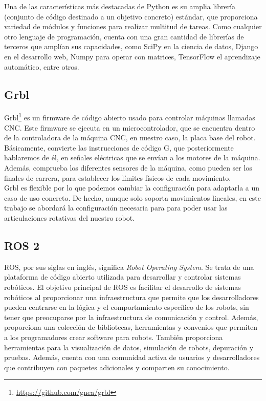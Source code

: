 Una de las características más destacadas de Python es su amplia librería (conjunto de código destinado a un objetivo concreto) estándar, que proporciona 
variedad de módulos y funciones para realizar multitud de tareas. Como cualquier otro lenguaje de programación, cuenta con una gran cantidad de librerías de terceros que 
amplían sus capacidades, como SciPy en la ciencia de datos, Django en el desarrollo web, Numpy para operar con matrices, TensorFlow el aprendizaje automático, entre otros.

\subsection{Grbl}
\label{subsec:grbl}
Grbl\footnote{\url{https://github.com/gnea/grbl}} es un firmware de código abierto usado para controlar máquinas llamadas \acs{CNC}. Este firmware se ejecuta en 
un microcontrolador, que se encuentra dentro de la controladora de la máquina \acs{CNC}, en nuestro caso, la placa base del robot. \\
Básicamente, convierte las instrucciones de código G, que posteriormente hablaremos de él, en señales eléctricas que se envían a los motores de la máquina. Además, 
comprueba los diferentes sensores de la máquina, como pueden ser los finales de carrera, para establecer los límites físicos de cada movimiento. \\
Grbl es flexible por lo que podemos cambiar la configuración para adaptarla a un caso de uso concreto. De hecho, aunque solo soporta movimientos lineales,
en este trabajo se abordará la configuración necesaria para para poder usar las articulaciones rotativas del nuestro robot.

\subsection{ROS 2}
\label{subsec:ros2}
ROS, por sus siglas en inglés, significa \textit{Robot Operating System}. Se trata de una plataforma de código abierto utilizada 
para desarrollar y controlar sistemas robóticos.
El objetivo principal de ROS es facilitar el desarrollo de sistemas robóticos al proporcionar una infraestructura que permite que
los desarrolladores pueden centrarse en la lógica y el comportamiento específico de los robots, sin tener que preocuparse por la 
infraestructura de comunicación y control. 
Además, proporciona una colección de bibliotecas, herramientas y convenios que permiten a los programadores crear software para robots. 
También proporciona herramientas para la visualización de datos, simulación de robots, depuración y pruebas. Además, 
cuenta con una comunidad activa de usuarios y desarrolladores que contribuyen con paquetes adicionales y comparten su 
conocimiento.

